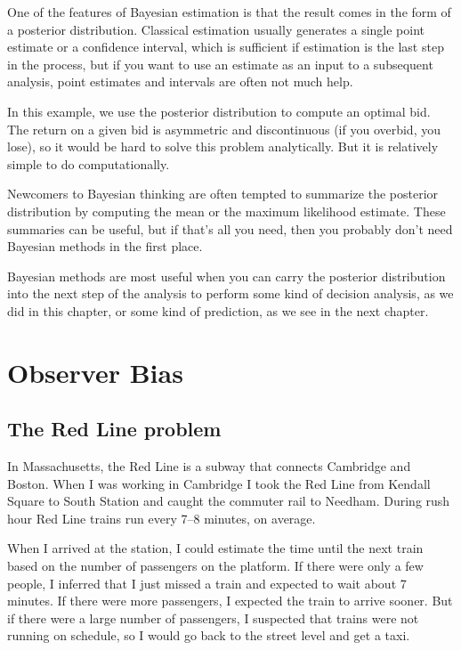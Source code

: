 \documentclass[12pt]{book}
\theoremstyle{exercise}
\begin{document}
One of the features of Bayesian estimation is that the
result comes in the form of a posterior distribution.  Classical
estimation usually generates a single point estimate or a confidence
interval, which is sufficient if estimation is the last step in the
process, but if you want to use an estimate as an input to a
subsequent analysis, point estimates and intervals are often not much
help.

In this example, we use the posterior distribution
to compute an optimal bid.  The return on a given bid is asymmetric
and discontinuous (if you overbid, you lose), so it would be hard to
solve this problem analytically.  But it is relatively simple to do
computationally.

Newcomers to Bayesian thinking are often tempted to summarize the
posterior distribution by computing the mean or the maximum
likelihood estimate.  These summaries can be useful, but if that's
all you need, then you probably don't need Bayesian methods in the
first place.

Bayesian methods are most useful when you can carry the posterior
distribution into the next step of the analysis to perform some
kind of decision analysis, as we did in this chapter, or some kind of
prediction, as we see in the next chapter.




\chapter{Observer Bias}
\label{observer}

\section{The Red Line problem}

In Massachusetts, the Red Line is a subway that connects
Cambridge and Boston.  When I was working in Cambridge I took the Red
Line from Kendall Square to South Station and caught the commuter rail
to Needham.  During rush hour Red Line trains run every 7--8
minutes, on average.

When I arrived at the station, I could estimate the time until
the next train based on the number of passengers on the platform.
If there were only a few people, I inferred that I just missed
a train and expected to wait about 7 minutes.  If there were
more passengers, I expected the train to arrive sooner.  But if
there were a large number of passengers, I suspected that
trains were not running on schedule, so I would go back to the
street level and get a taxi.
\end{document}
